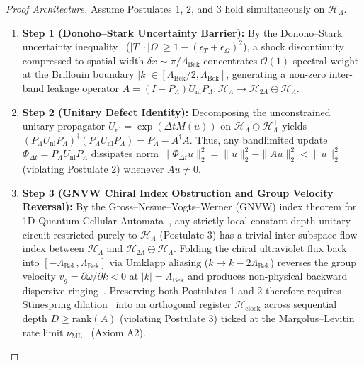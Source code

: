 \documentclass[11pt,a4paper]{article}
\theoremstyle{definition}
\begin{document}
\begin{proof}[Proof Architecture]
Assume Postulates 1, 2, and 3 hold simultaneously on $\mathcal{H}_{\Lambda}$.
\begin{enumerate}
\item \textbf{Step 1 (Donoho--Stark Uncertainty Barrier):} By the Donoho--Stark uncertainty inequality~\cite{donohostark1989} ($|T|\cdot |\Omega| \ge 1 - (\epsilon_T + \epsilon_{\Omega})^2$), a shock discontinuity compressed to spatial width $\delta x \sim \pi / \Lambda_{\text{Bek}}$ concentrates $\mathcal{O}(1)$ spectral weight at the Brillouin boundary $|k| \in [\Lambda_{\text{Bek}}/2, \Lambda_{\text{Bek}}]$, generating a non-zero inter-band leakage operator $A = (I - P_{\Lambda}) U_{\text{nl}} P_{\Lambda} : \mathcal{H}_{\Lambda} \to \mathcal{H}_{2\Lambda} \ominus \mathcal{H}_{\Lambda}$.
\item \textbf{Step 2 (Unitary Defect Identity):} Decomposing the unconstrained unitary propagator $U_{\text{nl}} = \exp(\Delta t M(u))$ on $\mathcal{H}_{\Lambda} \oplus \mathcal{H}_{\Lambda}^{\perp}$ yields $(P_{\Lambda} U_{\text{nl}} P_{\Lambda})^\dagger (P_{\Lambda} U_{\text{nl}} P_{\Lambda}) = P_{\Lambda} - A^\dagger A$. Thus, any bandlimited update $\Phi_{\Delta t} = P_{\Lambda} U_{\text{nl}} P_{\Lambda}$ dissipates norm $\|\Phi_{\Delta t} u\|_2^2 = \|u\|_2^2 - \|A u\|_2^2 < \|u\|_2^2$ (violating Postulate 2) whenever $A u \ne 0$.
\item \textbf{Step 3 (GNVW Chiral Index Obstruction and Group Velocity Reversal):} By the Gross--Nesme--Vogts--Werner (GNVW) index theorem for 1D Quantum Cellular Automata~\cite{gnvw2012}, any strictly local constant-depth unitary circuit restricted purely to $\mathcal{H}_{\Lambda}$ (Postulate 3) has a trivial inter-subspace flow index between $\mathcal{H}_{\Lambda}$ and $\mathcal{H}_{2\Lambda} \ominus \mathcal{H}_{\Lambda}$. Folding the chiral ultraviolet flux back into $[-\Lambda_{\text{Bek}}, \Lambda_{\text{Bek}}]$ via Umklapp aliasing ($k \mapsto k - 2\Lambda_{\text{Bek}}$) reverses the group velocity $v_g = \partial\omega/\partial k < 0$ at $|k| = \Lambda_{\text{Bek}}$ and produces non-physical backward dispersive ringing~\cite{laxlevermore1983}. Preserving both Postulates 1 and 2 therefore requires Stinespring dilation~\cite{stinespring1955} into an orthogonal register $\mathcal{H}_{\text{clock}}$ across sequential depth $D \ge \mathrm{rank}(A)$ (violating Postulate 3) ticked at the Margolus--Levitin rate limit $\nu_{\text{ML}}$~\cite{margolus1998} (Axiom A2).
\end{enumerate}
\end{proof}
\end{document}
